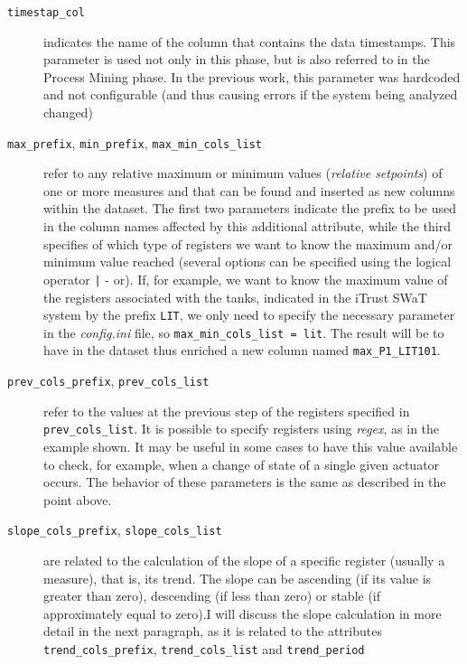 \begin{description}
	\item[\texttt{timestap\_col}] indicates the name of the column that contains the data timestamps. This parameter is used not only in this phase, but is also referred to in the Process Mining phase. In the previous work, this parameter was hardcoded and not configurable (and thus causing errors if the system being analyzed changed)
	
	\item[\texttt{max\_prefix}, \texttt{min\_prefix}, \texttt{max\_min\_cols\_list}] refer to any relative maximum or minimum values (\textit{relative setpoints}) of one or more measures and that can be found and inserted as new columns within the dataset. The first two parameters indicate the prefix to be used in the column names affected by this additional attribute, while the third specifies of which type of registers we want to know the maximum and/or minimum value reached (several options can be specified using the logical operator \texttt{|} - or).\newline 
	If, for example, we want to know the maximum value of the registers associated with the tanks, indicated in the iTrust SWaT system by the prefix \texttt{LIT}, we only need to specify the necessary parameter in the \textit{config.ini} file, so \texttt{max\_min\_cols\_list = lit}.\newline
	The result will be to have in the dataset thus enriched a new column named \texttt{max\_P1\_LIT101}.
	
	\item[\texttt{prev\_cols\_prefix}, \texttt{prev\_cols\_list}]  refer to the values at the previous step of the registers specified in \texttt{prev\_cols\_list}. It is possible to specify registers using \textit{regex}, as in the example shown. It may be useful in some cases to have this value available to check, for example, when a change of state of a single given actuator occurs.  The behavior of these parameters is the same as described in the point above.
	
	\item[\texttt{slope\_cols\_prefix}, \texttt{slope\_cols\_list}] are related to the calculation of the slope of a specific register (usually a measure), that is, its trend. The slope can be ascending (if its value is greater than zero), descending (if less than zero) or stable (if approximately equal to zero).I will discuss the slope calculation in more detail in the next paragraph, as it is related to the attributes \texttt{trend\_cols\_prefix}, \texttt{trend\_cols\_list} and \texttt{trend\_period}
\end{description}

